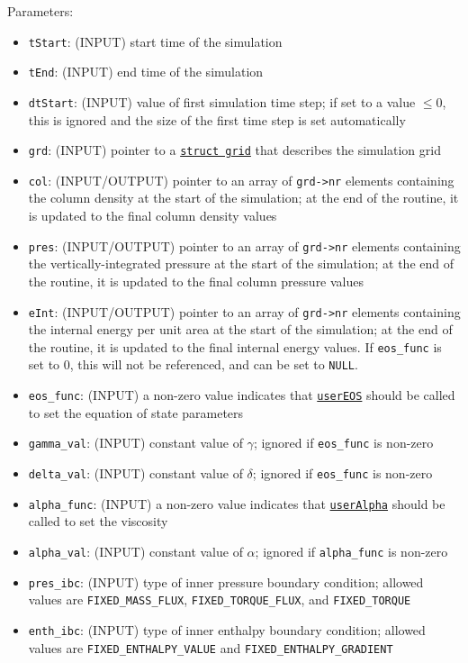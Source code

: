 \documentclass[12pt]{article}
\begin{document}
Parameters:
\begin{itemize}
\item \texttt{tStart}: (INPUT) start time of the simulation
\item \texttt{tEnd}: (INPUT) end time of the simulation
\item \texttt{dtStart}: (INPUT) value of first simulation time step; if set to a value $\leq 0$, this is ignored and the size of the first time step is set automatically
\item \texttt{grd}: (INPUT) pointer to a \hyperref[sssec:datastructures]{\texttt{struct grid}} that describes the simulation grid
\item \texttt{col}: (INPUT/OUTPUT) pointer to an array of \texttt{grd->nr} elements containing the column density at the start of the simulation; at the end of the routine, it is updated to the final column density values
\item \texttt{pres}: (INPUT/OUTPUT) pointer to an array of \texttt{grd->nr} elements containing the vertically-integrated pressure at the start of the simulation; at the end of the routine, it is updated to the final column pressure values
\item \texttt{eInt}: (INPUT/OUTPUT) pointer to an array of \texttt{grd->nr} elements containing the internal energy per unit area at the start of the simulation; at the end of the routine, it is updated to the final internal energy values. If \verb=eos_func= is set to 0, this will not be referenced, and can be set to \texttt{NULL}.
\item \verb=eos_func=: (INPUT) a non-zero value indicates that \hyperref[sssec:userEOS]{\texttt{userEOS}} should be called to set the equation of state parameters
\item \verb=gamma_val=: (INPUT) constant value of $\gamma$; ignored if \verb=eos_func= is non-zero
\item \verb=delta_val=: (INPUT) constant value of $\delta$; ignored if \verb=eos_func= is non-zero
\item \verb=alpha_func=: (INPUT) a non-zero value indicates that \hyperref[sssec:userAlpha]{\texttt{userAlpha}} should be called to set the viscosity
\item \verb=alpha_val=: (INPUT) constant value of $\alpha$; ignored if \verb=alpha_func= is non-zero
\item \verb=pres_ibc=: (INPUT) type of inner pressure boundary condition; allowed values are \verb=FIXED_MASS_FLUX=, \verb=FIXED_TORQUE_FLUX=, and \verb=FIXED_TORQUE=
\item \verb=enth_ibc=: (INPUT) type of inner enthalpy boundary condition; allowed values are \verb=FIXED_ENTHALPY_VALUE= and \verb=FIXED_ENTHALPY_GRADIENT=

\end{itemize}
\end{document}
